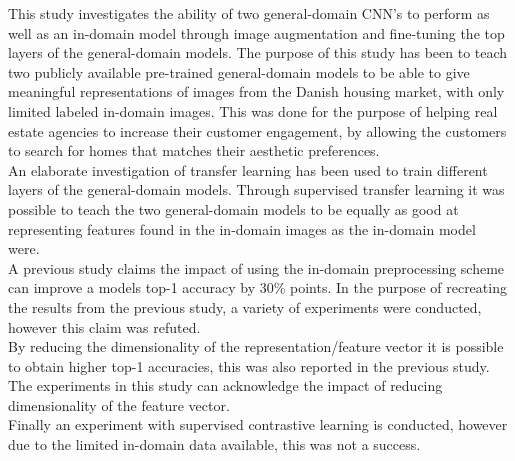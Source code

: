 This study investigates the ability of two general-domain CNN's to perform as well as an in-domain model through image augmentation and fine-tuning the top layers of the general-domain models. The purpose of this study has been to teach two publicly available pre-trained general-domain models to be able to give meaningful representations of images from the Danish housing market, with only limited labeled in-domain images. This was done for the purpose of helping real estate agencies to increase their customer engagement, by allowing the customers to search for homes that matches their aesthetic preferences.
\vspace{3mm}\\
An elaborate investigation of transfer learning has been used to train different layers of the general-domain models. Through supervised transfer learning it was possible to teach the two general-domain models to be equally as good at representing features found in the in-domain images as the in-domain model were.
\vspace{3mm}\\
A previous study claims the impact of using the in-domain preprocessing scheme can improve a models top-1 accuracy by 30\% points. In the purpose of recreating the results from the previous study, a variety of experiments were conducted, however this claim was refuted.
\vspace{3mm}\\
By reducing the dimensionality of the representation/feature vector it is possible to obtain higher top-1 accuracies, this was also reported in the previous study. The experiments in this study can acknowledge the impact of reducing dimensionality of the feature vector.
\vspace{3mm}\\
Finally an experiment with supervised contrastive learning is conducted, however due to the limited in-domain data available, this was not a success.
